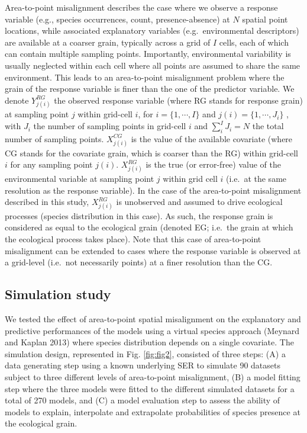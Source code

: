\documentclass[
  12pt,
  a4paper]{article}
\begin{document}
Area-to-point misalignment describes the case where we observe a response variable (e.g., species occurrences, count, presence-absence) at \(N\) spatial point locations, while associated explanatory variables (e.g.~environmental descriptors) are available at a coarser grain, typically across a grid of \(I\) cells, each of which can contain multiple sampling points. Importantly, environmental variability is usually neglected within each cell where all points are assumed to share the same environment. This leads to an area-to-point misalignment problem where the grain of the response variable is finer than the one of the predictor variable. We denote \(Y_{j(i)}^{RG}\) the observed response variable (where RG stands for response grain) at sampling point \(j\) within grid-cell \(i\), for \(i = \{1, \cdots, I\}\) and \(j(i) = \{1, \cdots, J_i\}\) , with \(J_i\) the number of sampling points in grid-cell \(i\) and \(\sum_i^I J_i = N\) the total number of sampling points. \(X_{j(i)}^{CG}\) is the value of the available covariate (where CG stands for the covariate grain, which is coarser than the RG) within grid-cell \(i\) for any sampling point \(j(i)\). \(X_{j(i)}^{RG}\) is the true (or error-free) value of the environmental variable at sampling point \(j\) within grid cell \(i\) (i.e.~at the same resolution as the response variable). In the case of the area-to-point misalignment described in this study, \(X_{j(i)}^{RG}\) is unobserved and assumed to drive ecological processes (species distribution in this case). As such, the response grain is considered as equal to the ecological grain (denoted EG; i.e.~the grain at which the ecological process takes place). Note that this case of area-to-point misalignment can be extended to cases where the response variable is observed at a grid-level (i.e.~not necessarily points) at a finer resolution than the CG.

\hypertarget{simulation-study}{%
\subsection{Simulation study}\label{simulation-study}}

We tested the effect of area-to-point spatial misalignment on the explanatory and predictive performances of the models using a virtual species approach (Meynard and Kaplan 2013) where species distribution depends on a single covariate. The simulation design, represented in Fig. \ref{fig:fig2}, consisted of three steps: (A) a data generating step using a known underlying SER to simulate 90 datasets subject to three different levels of area-to-point misalignment, (B) a model fitting step where the three models were fitted to the different simulated datasets for a total of 270 models, and (C) a model evaluation step to assess the ability of models to explain, interpolate and extrapolate probabilities of species presence at the ecological grain.
\end{document}
